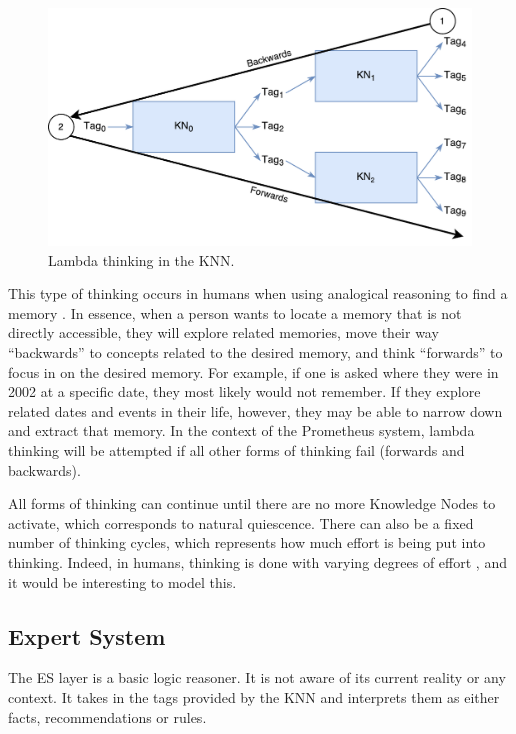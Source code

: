 \documentclass[titlepage,11pt]{article}
\begin{document}
\begin{figure}[!htb]
\includegraphics[width=\columnwidth]{figures/lambda_thinking.pdf}
\caption{Lambda thinking in the KNN.}
\label{think_lambda}
\end{figure}

This type of thinking occurs in humans when using analogical reasoning to find a memory \cite{vybihal-lambda}. In essence, when a person wants to locate a memory that is not directly accessible, they will explore related memories, move their way ``backwards'' to concepts related to the desired memory, and think ``forwards'' to focus in on the desired memory. For example, if one is asked where they were in 2002 at a specific date, they most likely would not remember. If they explore related dates and events in their life, however, they may be able to narrow down and extract that memory. In the context of the Prometheus system, lambda thinking will be attempted if all other forms of thinking fail (forwards and backwards).

All forms of thinking can continue until there are no more Knowledge Nodes to activate, which corresponds to natural quiescence. There can also be a fixed number of thinking cycles, which represents how much effort is being put into thinking. Indeed, in humans, thinking is done with varying degrees of effort \cite{thinking}, and it would be interesting to model this.

\subsection{Expert System}

The ES layer is a basic logic reasoner. It is not aware of its current reality or any context. It takes in the tags provided by the KNN and interprets them as either facts, recommendations or rules.
\end{document}
